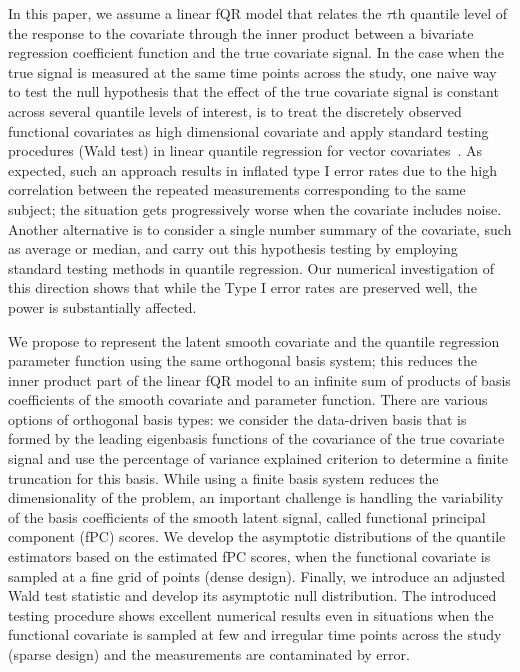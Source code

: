 \documentclass[times,sort&compress,3p]{elsarticle}
\theoremstyle{plain}%
\theoremstyle{definition}
\begin{document}
In this paper, we assume a linear fQR model that relates the $\tau$th quantile level of the response to the covariate through the inner product between a bivariate regression coefficient function and the true covariate signal. In the case when the true signal is measured at the same time points across the study, one naive way to test the null hypothesis that the effect of the true covariate signal is constant across several quantile levels of interest, is to treat the discretely observed functional covariates as high dimensional covariate and apply standard testing procedures (Wald test) in linear quantile regression for vector covariates~\citep{koenker2005}. As expected, such an approach results in inflated type I error rates due to the high correlation between the repeated measurements corresponding to the same subject; the situation gets progressively worse when the covariate includes noise. Another alternative is to consider a single number summary of the covariate, such as average or median, and carry out this hypothesis testing by employing standard testing methods in quantile regression. Our numerical investigation of this direction shows that while the Type I error rates are preserved well, the power is substantially affected.

We propose to represent the latent smooth covariate and the quantile regression parameter function using the same orthogonal basis system; this reduces the inner product part of the linear fQR model to an infinite sum of products of basis coefficients of the smooth covariate and parameter function. There are various options of orthogonal basis types: we consider the data-driven basis that is formed by the leading eigenbasis functions of the covariance of the true covariate signal and use the percentage of variance explained criterion to determine a finite truncation for this basis. While using a finite basis system reduces the dimensionality of the problem, an important challenge is handling the variability of the basis coefficients of the smooth latent signal, called functional principal component (fPC) scores. We develop the asymptotic distributions of the quantile estimators based on the estimated fPC scores, when the functional covariate is sampled at a fine grid of points (dense design). Finally, we introduce an adjusted Wald test statistic and develop its asymptotic null distribution. The introduced testing procedure shows excellent numerical results even in situations when the functional covariate is sampled at few and irregular time points across the study (sparse design) and the measurements are contaminated by error.
\end{document}
